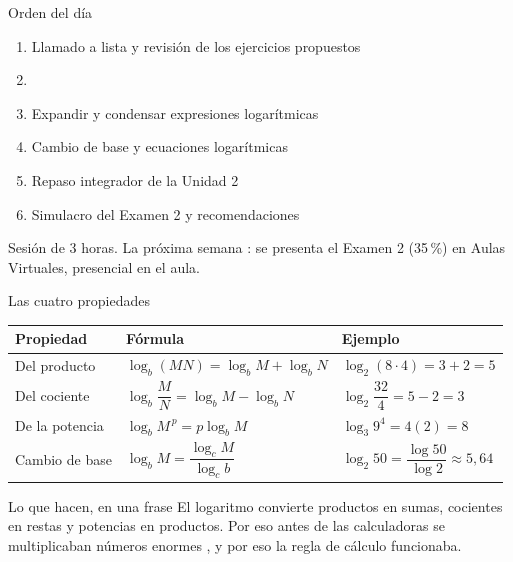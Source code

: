 \documentclass[aspectratio=169,10pt]{beamer}
\begin{document}
\portada

\begin{frame}{Orden del día}
  \begin{enumerate}
    \item Llamado a lista y revisión de los ejercicios propuestos
    \item {}
    \item Expandir y condensar expresiones logarítmicas
    \item Cambio de base y ecuaciones logarítmicas
    \item Repaso integrador de la Unidad 2
    \item Simulacro del Examen 2 y recomendaciones
  \end{enumerate}

  \vspace{0.25cm}
  {\footnotesize\color{uniGris} Sesión de 3 horas. La próxima semana
  : se presenta el Examen 2 (35\,\%) en Aulas
  Virtuales, presencial en el aula.}
\end{frame}


\begin{frame}{Las cuatro propiedades}
  \scriptsize
  \begin{center}
  \begin{tabular}{@{}p{2.8cm}p{4.2cm}p{4.6cm}@{}}
    \toprule
    \textbf{Propiedad} & \textbf{Fórmula} & \textbf{Ejemplo} \\
    \midrule
    Del producto &
      $\log_{b}(MN) = \log_{b}M + \log_{b}N$ &
      $\log_{2}(8\cdot 4) = 3+2 = 5$ \\
    \addlinespace
    Del cociente &
      $\log_{b}\dfrac{M}{N} = \log_{b}M - \log_{b}N$ &
      $\log_{2}\dfrac{32}{4} = 5-2 = 3$ \\
    \addlinespace
    De la potencia &
      $\log_{b}M^{\,p} = p\log_{b}M$ &
      $\log_{3}9^{4} = 4(2) = 8$ \\
    \addlinespace
    Cambio de base &
      $\log_{b}M = \dfrac{\log_{c}M}{\log_{c}b}$ &
      $\log_{2}50 = \dfrac{\log 50}{\log 2} \approx 5{,}64$ \\
    \bottomrule
  \end{tabular}
  \end{center}

  \vspace{0.08cm}
  \begin{alertblock}{Lo que hacen, en una frase}
    \tiny
     El logaritmo convierte productos en
    sumas, cocientes en restas y potencias en productos. Por eso antes de las
    calculadoras se multiplicaban números enormes , y
    por eso la regla de cálculo funcionaba.
  \end{alertblock}
\end{frame}
\end{document}
